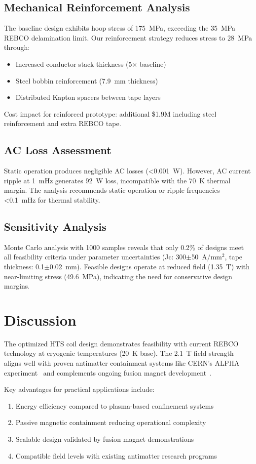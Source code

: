 \documentclass[journal]{IEEEtran}
\begin{document}
\subsection{Mechanical Reinforcement Analysis}
The baseline design exhibits hoop stress of 175~MPa, exceeding the 35~MPa REBCO delamination limit. Our reinforcement strategy reduces stress to 28~MPa through:
\begin{itemize}
\item Increased conductor stack thickness (5$\times$ baseline)
\item Steel bobbin reinforcement (7.9~mm thickness)
\item Distributed Kapton spacers between tape layers
\end{itemize}

Cost impact for reinforced prototype: additional \$1.9M including steel reinforcement and extra REBCO tape.

\subsection{AC Loss Assessment}
Static operation produces negligible AC losses (<0.001~W). However, AC current ripple at 1~mHz generates 92~W loss, incompatible with the 70~K thermal margin. The analysis recommends static operation or ripple frequencies <0.1~mHz for thermal stability.

\subsection{Sensitivity Analysis}
Monte Carlo analysis with 1000 samples reveals that only 0.2\% of designs meet all feasibility criteria under parameter uncertainties (Jc: 300$\pm$50~A/mm$^2$, tape thickness: 0.1$\pm$0.02~mm). Feasible designs operate at reduced field (1.35~T) with near-limiting stress (49.6~MPa), indicating the need for conservative design margins.

\section{Discussion}
The optimized HTS coil design demonstrates feasibility with current REBCO technology at cryogenic temperatures (20~K base). The 2.1~T field strength aligns well with proven antimatter containment systems like CERN's ALPHA experiment~\cite{cern_alpha2022} and complements ongoing fusion magnet development~\cite{sparc2020,tokamak_energy2022}.

Key advantages for practical applications include:
\begin{enumerate}
\item Energy efficiency compared to plasma-based confinement systems
\item Passive magnetic containment reducing operational complexity
\item Scalable design validated by fusion magnet demonstrations~\cite{mit_psfc2023}
\item Compatible field levels with existing antimatter research programs~\cite{cern_antimatter2021}
\end{enumerate}
\end{document}
